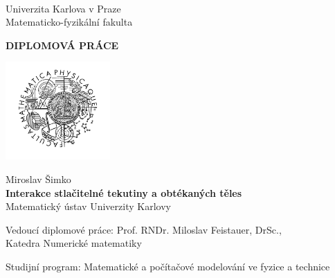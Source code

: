 \begin{titlepage}
\begin{center}
\ \\

\vspace{15mm}

\large
Univerzita Karlova v Praze\\
Matematicko-fyzikální fakulta\\

\vspace{5mm}

{\Large\bf DIPLOMOVÁ PRÁCE}

\vspace{10mm}

\includegraphics[width=4cm]{obrazky/logo.jpg}

\vspace{15mm}

{\Large Miroslav Šimko}\\
\vspace{5mm}
{\Large\bf Interakce stlačitelné tekutiny a obtékaných těles}\\
\vspace{5mm}
Matematický ústav Univerzity Karlovy\\
\end{center}
\vspace{10mm}

\large
\noindent Vedoucí diplomové práce: Prof. RNDr. Miloslav Feistauer, DrSc., \\
\hskip20mm Katedra Numerické matematiky

\vspace{1mm} 

\noindent Studijní program: Matematické a počítačové modelování ve fyzice a technice

\vspace{5mm}


\end{titlepage}
